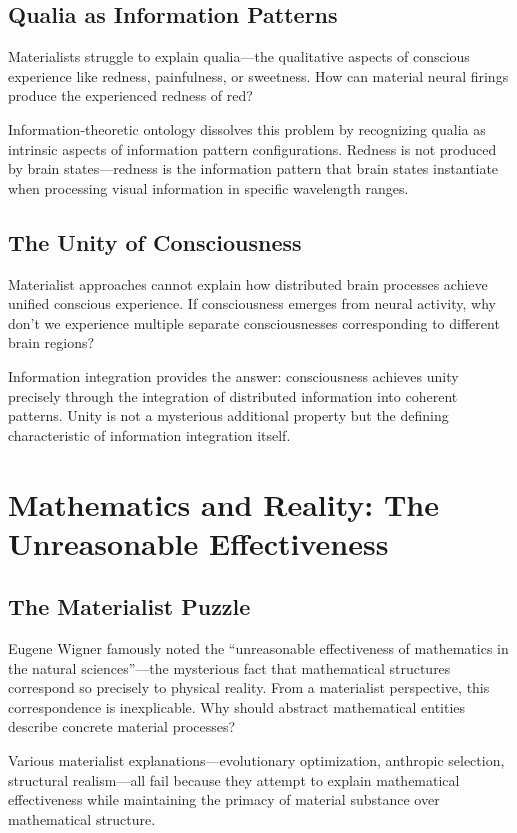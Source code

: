 \documentclass[12pt]{article}
\begin{document}
\subsection{Qualia as Information Patterns}

Materialists struggle to explain qualia—the qualitative aspects of conscious experience like redness, painfulness, or sweetness. How can material neural firings produce the experienced redness of red?

Information-theoretic ontology dissolves this problem by recognizing qualia as intrinsic aspects of information pattern configurations. Redness is not produced by brain states—redness is the information pattern that brain states instantiate when processing visual information in specific wavelength ranges.

\subsection{The Unity of Consciousness}

Materialist approaches cannot explain how distributed brain processes achieve unified conscious experience. If consciousness emerges from neural activity, why don't we experience multiple separate consciousnesses corresponding to different brain regions?

Information integration provides the answer: consciousness achieves unity precisely through the integration of distributed information into coherent patterns. Unity is not a mysterious additional property but the defining characteristic of information integration itself.

\section{Mathematics and Reality: The Unreasonable Effectiveness}

\subsection{The Materialist Puzzle}

Eugene Wigner famously noted the ``unreasonable effectiveness of mathematics in the natural sciences''—the mysterious fact that mathematical structures correspond so precisely to physical reality. From a materialist perspective, this correspondence is inexplicable. Why should abstract mathematical entities describe concrete material processes?

Various materialist explanations—evolutionary optimization, anthropic selection, structural realism—all fail because they attempt to explain mathematical effectiveness while maintaining the primacy of material substance over mathematical structure.
\end{document}
